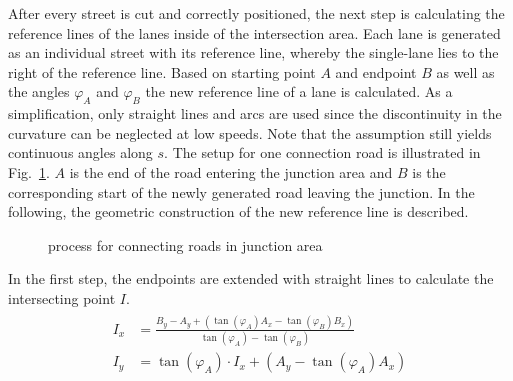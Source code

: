 \documentclass[a4paper, 10pt, conference]{ieeeconf}      %
\begin{document}


    After every street is cut and correctly positioned, the next step is calculating the reference lines of the lanes inside of the intersection area. Each lane is generated as an individual street with its reference line, whereby the single-lane lies to the right of the reference line. Based on starting point \(A\) and endpoint \(B\) as well as the angles \(\varphi_{A}\) and \(\varphi_{B}\) the new reference line of a lane is calculated. As a simplification, only straight lines and arcs are used since the discontinuity in the curvature can be neglected at low speeds. Note that the assumption still yields continuous angles along $s$. The setup for one connection road is illustrated in Fig.~\ref{fig_connecting_road}. $A$ is the end of the road entering the junction area and $B$ is the corresponding start of the newly generated road leaving the junction. In the following, the geometric construction of the new reference line is described.
    \begin{figure}[thpb]
    	
    	\caption{process for connecting roads in junction area}
    	\label{fig_connecting_road}
    \end{figure}

    In the first step, the endpoints are extended with straight lines to calculate the intersecting point \(I\). 
    \begin{align}
        \begin{split}
            I_x &= \frac{B_y - A_y + \left(\tan(\varphi_A) A_x - \tan(\varphi_B) B_x\right)}{\tan(\varphi_A) - \tan(\varphi_B)} \\
            I_y &= \tan(\varphi_A) \cdot I_x + \left(A_y - \tan(\varphi_A) A_x\right)\\
        \end{split}     
    \end{align}
\end{document}
